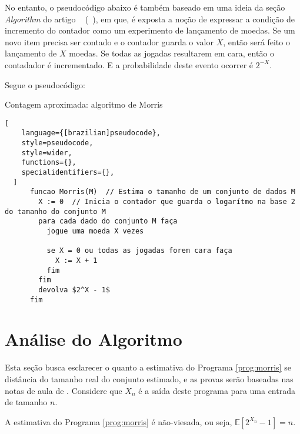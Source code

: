 No entanto, o pseudocódigo abaixo é também baseado em uma ideia da seção \textit{Algorithm} do artigo ~ (~\cite{ApproximateCountingAlgorithm}), 
em que, é exposta a noção de expressar a condição de incremento do contador como um experimento de lançamento de moedas. 
Se um novo item precisa ser contado e o contador guarda o valor $X$, então será feito o lançamento de $X$ moedas. Se todas as jogadas resultarem em cara, então o contadador é incrementado.
E a probabilidade deste evento ocorrer é $2^{-X}$. 

Segue o pseudocódigo:
\begin{programruledcaption}{Contagem aproximada: algoritmo de Morris\label{prog:morris}}
  \begin{lstlisting}[
    language={[brazilian]pseudocode},
    style=pseudocode,
    style=wider,
    functions={},
    specialidentifiers={},
  ]
      funcao Morris(M)  // Estima o tamanho de um conjunto de dados M
        X := 0  // Inicia o contador que guarda o logarítmo na base 2 do tamanho do conjunto M
        para cada dado do conjunto M faça
          jogue uma moeda X vezes

          se X = 0 ou todas as jogadas forem cara faça
            X := X + 1
          fim
        fim
        devolva $2^X - 1$
      fim
  \end{lstlisting}
\end{programruledcaption}

\section{Análise do Algoritmo}
\label{sec:morris:analysis}

Esta seção busca esclarecer o quanto a estimativa do Programa \ref{prog:morris} se distância do tamanho real do conjunto estimado, e as provas
serão baseadas nas notas de aula de \citep{LectureNotesAndoni}.
Considere que $X_n$ é a saída deste programa para uma entrada de tamanho $n$.

\begin{lemma} \label{morris:expected_value}
A estimativa do Programa \ref{prog:morris} é não-viesada, ou seja, $\mathbb{E}[2^{X_n} - 1] = n$.
\end{lemma}

